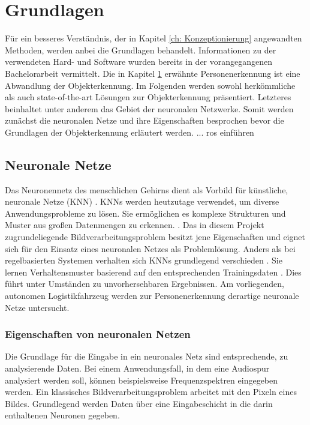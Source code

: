 \chapter{Grundlagen}
\label{ch: Grundlagen}
	Für ein besseres Verständnis, der in Kapitel \ref{ch: Konzeptionierung} angewandten Methoden, werden anbei die Grundlagen behandelt. Informationen zu der verwendeten Hard- und Software wurden bereits in der vorangegangenen Bachelorarbeit vermittelt. Die in Kapitel \ref{ch: Grundlagen} erwähnte Personenerkennung ist eine Abwandlung der Objekterkennung. Im Folgenden werden sowohl herkömmliche als auch state-of-the-art Lösungen zur Objekterkennung präsentiert. Letzteres beinhaltet unter anderem das Gebiet der neuronalen Netzwerke. Somit werden zunächst die neuronalen Netze und ihre Eigenschaften besprochen bevor die Grundlagen der Objekterkennung erläutert werden.  ... ros einführen
 
	
 	\section{Neuronale Netze}
	\label{sec: ROS}
	
	Das Neuronennetz des menschlichen Gehirns dient als Vorbild für künstliche, neuronale Netze (KNN) \cite{neuronennetz}. KNNs werden heutzutage verwendet, um diverse Anwendungsprobleme zu lösen.
	Sie ermöglichen es komplexe Strukturen und Muster aus großen Datenmengen zu erkennen.
	\cite{neuronennetz}. Das in diesem Projekt zugrundeliegende Bildverarbeitungsproblem besitzt jene Eigenschaften und eignet sich für den Einsatz eines neuronalen Netzes als Problemlösung. Anders als bei regelbasierten Systemen verhalten sich KNNs grundlegend verschieden \cite{proba}. Sie lernen Verhaltensmuster basierend auf den entsprechenden Trainingsdaten \cite{proba}. Dies führt unter Umständen zu unvorhersehbaren Ergebnissen. Am vorliegenden, autonomen Logistikfahrzeug werden zur Personenerkennung derartige neuronale Netze untersucht.
	
		\subsection{Eigenschaften von neuronalen Netzen}
		\label{subsec: Eigenschaften von neuronalen Netzen}
		Die Grundlage für die Eingabe in ein neuronales Netz sind entsprechende, zu analysierende Daten. Bei einem Anwendungsfall, in dem eine Audiospur analysiert werden soll, können beispielsweise Frequenzspektren eingegeben werden. Ein klassisches Bildverarbeitungsproblem arbeitet mit den Pixeln eines Bildes. Grundlegend werden Daten über eine Eingabeschicht in die darin enthaltenen Neuronen gegeben. \\
		
